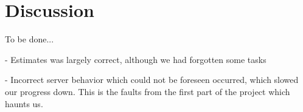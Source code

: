 \section{Discussion}
To be done...

- Estimates was largely correct, although we had forgotten some tasks

- Incorrect server behavior which could not be foreseen occurred, which slowed our progress down. This is the faults from the first part of the project which haunts us.
\newpage